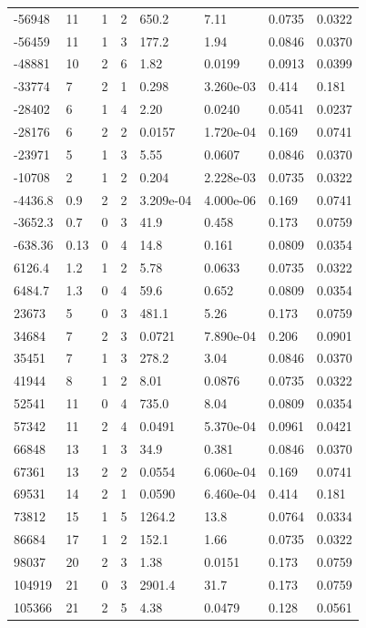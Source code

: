\documentclass[preview]{standalone}
\begin{document}
{{\begin{tabular}{L{1.2cm}C{1.2cm} C{0.3cm}C{0.5cm} C{1.4cm}C{1.4cm} C{1.4cm}C{1.4cm}}
  -56948  &    11  & 1     &  2 &  650.2  & 7.11  & 0.0735 &  0.0322   \\ 
  -56459  &    11  & 1     &  3 &  177.2  & 1.94  & 0.0846 &  0.0370   \\ 
  -48881  &    10  & 2     &  6 &  1.82  & 0.0199  & 0.0913 &  0.0399   \\ 
  -33774  &     7  & 2     &  1 &  0.298  & 3.260e-03  & 0.414 &  0.181   \\ 
  -28402  &     6  & 1     &  4 &  2.20  & 0.0240  & 0.0541 &  0.0237   \\ 
  -28176  &     6  & 2     &  2 &  0.0157  & 1.720e-04  & 0.169 &  0.0741   \\ 
  -23971  &     5  & 1     &  3 &  5.55  & 0.0607  & 0.0846 &  0.0370   \\ 
  -10708  &     2  & 1     &  2 &  0.204  & 2.228e-03  & 0.0735 &  0.0322   \\ 
  -4436.8  &   0.9  & 2     &  2 &  3.209e-04  & 4.000e-06  & 0.169 &  0.0741   \\ 
  -3652.3  &   0.7  & 0     &  3 &  41.9  & 0.458  & 0.173 &  0.0759   \\ 
  -638.36  &  0.13  & 0     &  4 &  14.8  & 0.161  & 0.0809 &  0.0354   \\ 
  6126.4  &   1.2  & 1     &  2 &  5.78  & 0.0633  & 0.0735 &  0.0322   \\ 
  6484.7  &   1.3  & 0     &  4 &  59.6  & 0.652  & 0.0809 &  0.0354   \\ 
  23673  &     5  & 0     &  3 &  481.1  & 5.26  & 0.173 &  0.0759   \\ 
  34684  &     7  & 2     &  3 &  0.0721  & 7.890e-04  & 0.206 &  0.0901   \\ 
  35451  &     7  & 1     &  3 &  278.2  & 3.04  & 0.0846 &  0.0370   \\ 
  41944  &     8  & 1     &  2 &  8.01  & 0.0876  & 0.0735 &  0.0322   \\ 
  52541  &    11  & 0     &  4 &  735.0  & 8.04  & 0.0809 &  0.0354   \\ 
  57342  &    11  & 2     &  4 &  0.0491  & 5.370e-04  & 0.0961 &  0.0421   \\ 
  66848  &    13  & 1     &  3 &  34.9  & 0.381  & 0.0846 &  0.0370   \\ 
  67361  &    13  & 2     &  2 &  0.0554  & 6.060e-04  & 0.169 &  0.0741   \\ 
  69531  &    14  & 2     &  1 &  0.0590  & 6.460e-04  & 0.414 &  0.181   \\ 
  73812  &    15  & 1     &  5 &  1264.2  & 13.8  & 0.0764 &  0.0334   \\ 
  86684  &    17  & 1     &  2 &  152.1  & 1.66  & 0.0735 &  0.0322   \\ 
  98037  &    20  & 2     &  3 &  1.38  & 0.0151  & 0.173 &  0.0759   \\ 
  104919  &    21  & 0     &  3 &  2901.4  & 31.7  & 0.173 &  0.0759   \\ 
  105366  &    21  & 2     &  5 &  4.38  & 0.0479  & 0.128 &  0.0561   \\ 
\hline 
\end{tabular} 

}}
\end{document}
